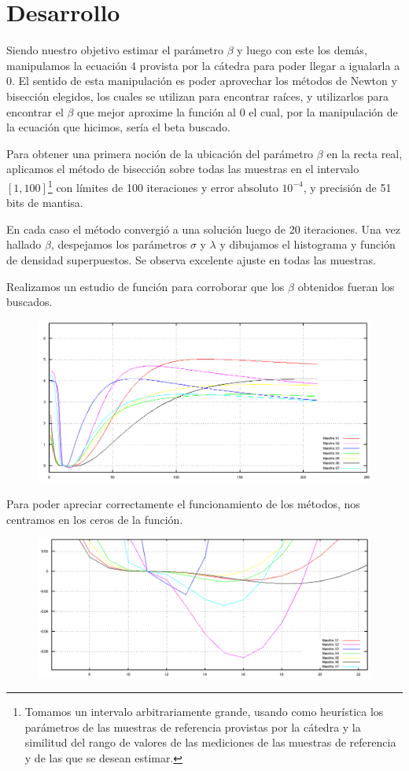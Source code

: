 \documentclass[a4paper,10pt,twoside]{article}
\begin{document}
\section{Desarrollo}
Siendo nuestro objetivo estimar el parámetro $\beta$ y luego con este los demás, manipulamos la ecuación 4 provista por la cátedra para poder llegar a igualarla a 0. El sentido de esta manipulación es poder aprovechar los métodos de Newton y bisección elegidos, los cuales se utilizan para encontrar raíces, y utilizarlos para encontrar el $\beta$ que mejor aproxime la función al 0 el cual, por la manipulación de la ecuación que hicimos, sería el beta buscado.

Para obtener una primera noción de la ubicación del parámetro $\beta$ en la
recta real, aplicamos el método de bisección sobre todas las muestras en el
intervalo $[1, 100]$\footnote{Tomamos un intervalo arbitrariamente grande,
usando como heurística los parámetros de las muestras de referencia provistas
por la cátedra y la similitud del rango de valores de las mediciones de las
muestras de referencia y de las que se desean estimar.} con límites de 100
iteraciones y error absoluto $10^{-4}$, y precisión de 51 bits de mantisa.

En cada caso el método convergió a una solución luego de 20 iteraciones.
Una vez hallado $\beta$, despejamos los parámetros $\sigma$ y $\lambda$ y
dibujamos el histograma y función de densidad superpuestos. Se observa
excelente ajuste en todas las muestras.

Realizamos un estudio de función para corroborar que los $\beta$ obtenidos fueran los buscados.
\begin{figure}[H]
  \centering
  \includegraphics[width=15cm]{estudioFuncion.png}
\end{figure}
Para poder apreciar correctamente el funcionamiento de los métodos, nos centramos en los ceros de la función.
\begin{figure}[H]
  \centering
  \includegraphics[width=15cm]{estudioFuncionZoom.png}
\end{figure}
\end{document}
